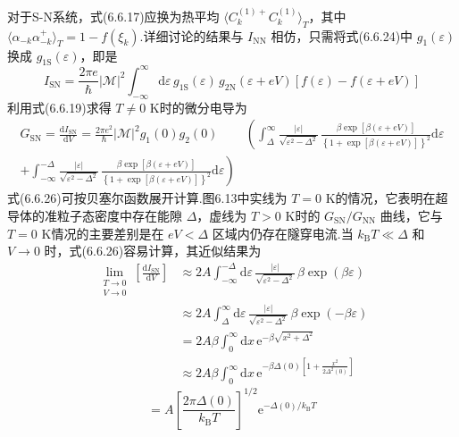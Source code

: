 对于S-N系统，式(6.6.17)应换为热平均 $\langle C^{(1)+}_{k}C^{(1)}_{k}\rangle_{T}$，其中 $\langle\alpha_{-k}\alpha^{+}_{-k}\rangle_{T}=1-f(\xi_{k})$.详细讨论的结果与 $I_{\mathrm{NN}}$ 相仿，只需将式(6.6.24)中 $g_{1}(\varepsilon)$ 换成 $g_{1\mathrm{S}}(\varepsilon)$，即是
\begin{equation}
  I_{\mathrm{SN}}=\frac{2\pi e}{\hbar}|\mathscr{M}|^{2}
  \int_{-\infty}^{\infty}\mathrm{d}\varepsilon\,
  g_{1\mathrm{S}}(\varepsilon)\,g_{2\mathrm{N}}(\varepsilon+eV)
  \left[f(\varepsilon)-f(\varepsilon+eV)\right]
\end{equation}
利用式(6.6.19)求得 $T\neq0$ K时的微分电导为
\begin{equation}
\begin{aligned}
  G_{\mathrm{SN}}=\frac{\mathrm{d}I_{\mathrm{SN}}}{\mathrm{d}V}
  =\frac{2\pi e^{2}}{\hbar}|\mathscr{M}|^{2}g_{1}(0)g_{2}(0)
  &\left(\int_{\Delta}^{\infty}\frac{|\varepsilon|}{\sqrt{\varepsilon^{2}-\Delta^{2}}}\,
  \frac{\beta\exp\left[\beta(\varepsilon+eV)\right]}
  {\left\{1+\exp\left[\beta(\varepsilon+eV)\right]\right\}^{2}}\mathrm{d}\varepsilon\right.\\
  \left.+\int_{-\infty}^{-\Delta}\frac{|\varepsilon|}{\sqrt{\varepsilon^{2}-\Delta^{2}}}\,
  \frac{\beta\exp\left[\beta(\varepsilon+eV)\right]}
  {\left\{1+\exp\left[\beta(\varepsilon+eV)\right]\right\}^{2}}\mathrm{d}\varepsilon\right)
\end{aligned}
\end{equation}
式(6.6.26)可按贝塞尔函数展开计算.图6.13中实线为 $T=0$ K的情况，它表明在超导体的准粒子态密度中存在能隙 $\Delta$，虚线为 $T>0$ K时的 $G_{\mathrm{SN}}/G_{\mathrm{NN}}$ 曲线，它与 $T=0$ K情况的主要差别是在 $eV<\Delta$ 区域内仍存在隧穿电流.当 $k_{\mathrm{B}}T\ll\Delta$ 和 $V\to0$ 时，式(6.6.26)容易计算，其近似结果为
\begin{equation*}
\begin{aligned}
  \lim_{\substack{T\to0\\ V\to0}}
  \left[\frac{\mathrm{d}I_{\mathrm{SN}}}{\mathrm{d}V}\right]
  &\approx 2A\int_{-\infty}^{-\Delta}\mathrm{d}\varepsilon\,
  \frac{|\varepsilon|}{\sqrt{\varepsilon^{2}-\Delta^{2}}}\,
  \beta\exp\left(\beta\varepsilon\right)\\
  &\approx 2A\int_{\Delta}^{\infty}\mathrm{d}\varepsilon\,
  \frac{|\varepsilon|}{\sqrt{\varepsilon^{2}-\Delta^{2}}}\,
  \beta\exp\left(-\beta\varepsilon\right)\\
  &=2A\beta\int_{0}^{\infty}\mathrm{d}x\,
  \mathrm{e}^{-\beta\sqrt{x^{2}+\Delta^{2}}}\\
  &\approx 2A\beta\int_{0}^{\infty}\mathrm{d}x\,
  \mathrm{e}^{-\beta\Delta(0)\left[1+\frac{x^{2}}{2\Delta^{2}(0)}\right]}
\end{aligned}
\end{equation*}
\begin{equation}
  =A\left[\frac{2\pi\Delta(0)}{k_{\mathrm{B}}T}\right]^{1/2}
  \mathrm{e}^{-\Delta(0)/k_{\mathrm{B}}T}
\end{equation}

